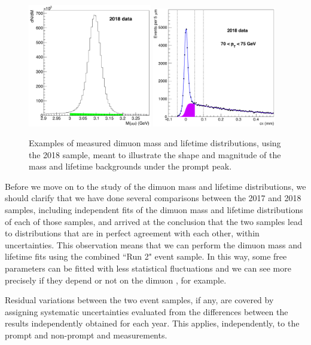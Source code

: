 \begin{figure}[h]
\centering
\includegraphics[width=0.48\textwidth]{Figures/chapter3/mass_continuum_background.pdf}
\includegraphics[width=0.48\textwidth]{Figures/chapter3/ltfit2.pdf}
\caption{Examples of measured dimuon mass and lifetime distributions,
using the 2018 \jpsi sample, meant to illustrate the shape and magnitude of the
mass and lifetime backgrounds under the prompt \jpsi peak.}
\label{fig:mass-and-lt-illustration}
\end{figure}

\vfill\newpage

Before we move on to the study of the dimuon mass and lifetime distributions, 
we should clarify that we have done several comparisons between the 2017 and 2018 samples, 
including independent fits of the dimuon mass and lifetime distributions of each of those samples,
and arrived at the conclusion that the two samples lead to distributions that are 
in perfect agreement with each other, within uncertainties.
This observation means that we can perform 
the dimuon mass and lifetime fits using the combined ``Run 2" event sample.
In this way, some free parameters can be fitted with less statistical fluctuations
and we can see more precisely if they depend or not on the dimuon \pt, for example.

Residual variations between the two event samples, if any, 
are covered by assigning systematic uncertainties evaluated from the 
differences between the results independently obtained for each year.
This applies, independently, to the prompt and non-prompt \jpsi and \psip measurements.

